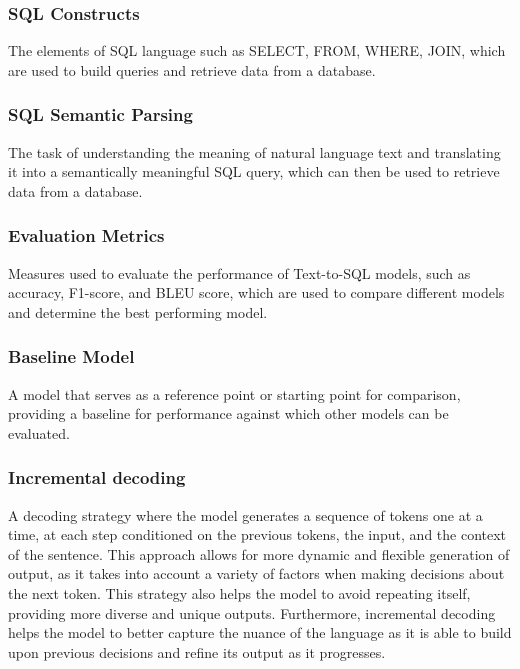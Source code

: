 \subsubsection{SQL Constructs} The elements of SQL language such as SELECT, FROM, WHERE, JOIN, which are used to build queries and retrieve data from a database.
\subsubsection{SQL Semantic Parsing} The task of understanding the meaning of natural language text and translating it into a semantically meaningful SQL query, which can then be used to retrieve data from a database.
\subsubsection{Evaluation Metrics} Measures used to evaluate the performance of Text-to-SQL models, such as accuracy, F1-score, and BLEU score, which are used to compare different models and determine the best performing model.
\subsubsection{Baseline Model} A model that serves as a reference point or starting point for comparison, providing a baseline for performance against which other models can be evaluated.
\subsubsection{Incremental decoding} A decoding strategy where the model generates a sequence of tokens one at a time, at each step conditioned on the previous tokens, the input, and the context of the sentence. This approach allows for more dynamic and flexible generation of output, as it takes into account a variety of factors when making decisions about the next token. This strategy also helps the model to avoid repeating itself, providing more diverse and unique outputs. Furthermore, incremental decoding helps the model to better capture the nuance of the language as it is able to build upon previous decisions and refine its output as it progresses.
